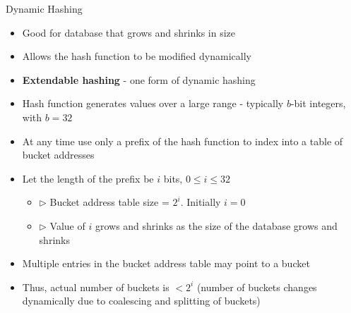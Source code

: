 \documentclass[aspectratio=169, xcolor=dvipsnames]{beamer}
\begin{document}
\begin{frame}{Dynamic Hashing}
    \begin{itemize}[<+->]
        \item Good for database that grows and shrinks in size
        \item Allows the hash function to be modified dynamically
        \item \textbf{Extendable hashing} - one form of dynamic hashing
        \item Hash function generates values over a large range - typically $b$-bit integers, with $b = 32$
        \item At any time use only a prefix of the hash function to index into a table of bucket addresses
        \item Let the length of the prefix be $i$ bits, $0 \le i \le 32$
        \begin{itemize}[<+->]
            \item $\triangleright$ Bucket address table size = $2^i$. Initially $i = 0$
            \item $\triangleright$ Value of $i$ grows and shrinks as the size of the database grows and shrinks
        \end{itemize}
        \item Multiple entries in the bucket address table may point to a bucket
        \item Thus, actual number of buckets is $< 2^i$ (number of buckets changes dynamically due to coalescing and splitting of buckets)
    \end{itemize}
\end{frame}
\end{document}
